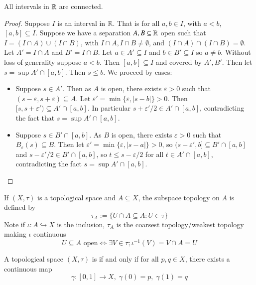 \begin{prop}\label{prop:3.1.6}
    All intervals in $\mathbb R$ are connected.
\end{prop}
\begin{proof}
    Suppose $I$ is an interval in $\mathbb R$. That is for all $a, b \in I$, with $a < b$, $[a,b] \subseteq I$. Suppose we have a separation $A, B \subseteq \mathbb R$ open such that $I = (I\cap A)\cup(I\cap B)$, with $I\cap A,I\cap B \neq \emptyset$, and $(I\cap A)\cap (I\cap B) = \emptyset$. Let $A' = I\cap A$ and $B' = I\cap B$. Let $a \in A' \subseteq I$ and $b \in B' \subseteq I$ so $a \neq b$. Without loss of generality suppose $a < b$. Then $[a,b] \subseteq I$ and covered by $A',B'$. Then let $s = \sup A'\cap [a,b]$. Then $s \leq b$. We proceed by cases:
    \begin{itemize}
        \item Suppose $s \in A'$. Then as $A$ is open, there exists $\varepsilon > 0$ such that $(s-\varepsilon,s+\varepsilon) \subseteq A$. Let $\varepsilon' = \min\{\varepsilon,|s-b|\} > 0$. Then $[s,s+\varepsilon') \subseteq A'\cap [a,b]$. In particular $s+\varepsilon'/2 \in A'\cap [a,b]$, contradicting the fact that $s = \sup A'\cap [a,b]$.
        \item Suppose $s \in B'\cap [a,b]$. As $B$ is open, there exists $\varepsilon > 0$ such that $B_{\varepsilon}(s) \subseteq B$. Then let $\varepsilon' = \min\{\varepsilon,|s-a|\} > 0$, so $(s-\varepsilon',b] \subseteq B'\cap [a,b]$ and $s - \varepsilon'/2 \in B'\cap [a,b]$, so $t \leq s-\varepsilon/2$ for all $t \in A'\cap [a,b]$, contradicting the fact $s = \sup A'\cap [a,b]$.
    \end{itemize}
\end{proof}

\begin{defn}
    If $(X,\tau)$ is a topological space and $A \subseteq X$, the subspace topology on $A$ is defined by \begin{equation*}
        \tau_A := \{U\cap A \subseteq A: U \in \tau\}
    \end{equation*}
    Note if $\iota:A\hookrightarrow X$ is the inclusion, $\tau_A$ is the coarsest topology/weakest topology making $\iota$ continuous $$U \subseteq A\text{ open} \iff \exists V \in \tau;\iota^{-1}(V) = V\cap A = U$$
\end{defn}

\begin{defn}
    A topological space $(X,\tau)$ is  if and only if for all $p,q \in X$, there exists a continuous map $$\gamma:[0,1]\rightarrow X,\;\gamma(0) = p,\;\gamma(1) = q$$
\end{defn}

